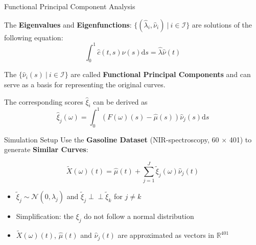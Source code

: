 \documentclass{beamer}
\newcommand{\independent}{\perp\!\!\!\!\perp}
\begin{document}
	\begin{frame}{Functional Principal Component Analysis}\label{FPCA}
	
		The \textbf{Eigenvalues} and \textbf{Eigenfunctions}: $\{(\hat{\lambda}_i, \hat{\nu}_i) \: \vert \: i \in \mathcal{I}\}$  are solutions of the following equation:
		$$ \int_{0}^{1}\hat{c}(t,s)\hat{\nu}(s) \mathrm{d}s = \hat{\lambda} \hat{\nu}(t) $$
		\vspace{0.2cm}
		
		The $\{\hat{\nu}_i(s) \: \vert \: i \in \mathcal{I}\}$ are called \textbf{Functional Principal Components} and can serve as a basis for representing the original curves. 
		\vspace{0.2cm}
		
		The corresponding scores $\hat{\xi}_i$ can be derived as
		$$\hat{\xi}_j(\omega) = \int_{0}^{1} (F(\omega)(s) - \hat{\mu}(s)) \hat{\nu}_j(s) \mathrm{d}s$$
		
		\hyperlink{PCA}{}
	\end{frame}

	\begin{frame}{Simulation Setup}
		Use the \textbf{Gasoline Dataset} (NIR-spectroscopy, 60 $\times$ 401) to generate \textbf{Similar Curves}:
	
		$$\tilde{X}(\omega)(t) = \hat{\mu}(t) + \sum_{j = 1}^{J} \tilde{\xi}_j(\omega) \hat{\nu}_j(t)$$ 
		\vspace{0.2cm}
		
		\begin{itemize}
			\item $\tilde{\xi}_{j} \sim \mathcal{N}(0,\hat{\lambda}_j)$ and $\tilde{\xi}_{j} \independent \tilde{\xi}_{k}$ for $j \neq k$
			\item Simplification: the $\xi_{j}$ do not follow a normal distribution
			\item $\tilde{X}(\omega)(t)$, $\hat{\mu}(t)$ and $\hat{\nu}_j(t)$ are approximated as vectors in $\mathbb{R}^{401}$
		\end{itemize}
		
	\end{frame}
	
\end{document}
